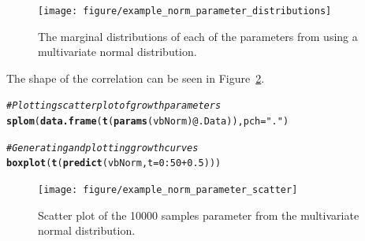 \documentclass[a4paper,english,10pt]{article}\usepackage[]{graphicx}\usepackage[]{color}
\makeatletter
\newcommand{\hlnum}[1]{\textcolor[rgb]{0.686,0.059,0.569}{#1}}%
\newcommand{\hlstr}[1]{\textcolor[rgb]{0.192,0.494,0.8}{#1}}%
\newcommand{\hlcom}[1]{\textcolor[rgb]{0.678,0.584,0.686}{\textit{#1}}}%
\newcommand{\hlopt}[1]{\textcolor[rgb]{0,0,0}{#1}}%
\newcommand{\hlstd}[1]{\textcolor[rgb]{0.345,0.345,0.345}{#1}}%
\newcommand{\hlkwc}[1]{\textcolor[rgb]{0.333,0.667,0.333}{#1}}%
\newcommand{\hlkwd}[1]{\textcolor[rgb]{0.737,0.353,0.396}{\textbf{#1}}}%
\newenvironment{kframe}{%
 \def\at@end@of@kframe{}%
 \ifinner\ifhmode%
  \def\at@end@of@kframe{\end{minipage}}%
  \begin{minipage}{\columnwidth}%
 \fi\fi%
 \def\FrameCommand##1{\hskip\@totalleftmargin \hskip-\fboxsep
 \colorbox{shadecolor}{##1}\hskip-\fboxsep
     \hskip-\linewidth \hskip-\@totalleftmargin \hskip\columnwidth}%
 \MakeFramed {\advance\hsize-\width
   \@totalleftmargin\z@ \linewidth\hsize
   \@setminipage}}%
 {\par\unskip\endMakeFramed%
 \at@end@of@kframe}
\newenvironment{knitrout}{}{} %
\makeatother
\begin{document}
\begin{figure}[h]
\begin{knitrout}
\color{fgcolor}

{\centering \texttt{[image: figure/example\_norm\_parameter\_distributions]} 

}



\end{knitrout}

\caption{The marginal distributions of each of the parameters from using a multivariate normal distribution.}
\label{fig:plot_norm_params}
\end{figure}

The shape of the correlation can be seen in Figure~\ref{fig:plot_norm_scatter}.
\begin{knitrout}
\color{fgcolor}\begin{kframe}
\begin{alltt}
\hlcom{# Plotting scatter plot of growth parameters}
\hlkwd{splom}\hlstd{(}\hlkwd{data.frame}\hlstd{(}\hlkwd{t}\hlstd{(}\hlkwd{params}\hlstd{(vbNorm)}\hlopt{@}\hlkwc{.Data}\hlstd{)),} \hlkwc{pch} \hlstd{=} \hlstr{"."}\hlstd{)}
\end{alltt}
\end{kframe}
\end{knitrout}


\begin{knitrout}
\color{fgcolor}\begin{kframe}
\begin{alltt}
\hlcom{# Generating and plotting growth curves}
\hlkwd{boxplot}\hlstd{(}\hlkwd{t}\hlstd{(}\hlkwd{predict}\hlstd{(vbNorm,} \hlkwc{t} \hlstd{=} \hlnum{0}\hlopt{:}\hlnum{50} \hlopt{+} \hlnum{0.5}\hlstd{)))}
\end{alltt}
\end{kframe}
\end{knitrout}


\begin{figure}[h]
\begin{knitrout}
\color{fgcolor}

{\centering \texttt{[image: figure/example\_norm\_parameter\_scatter]} 

}



\end{knitrout}

\caption{Scatter plot of the 10000 samples parameter from the multivariate normal distribution.}
\label{fig:plot_norm_scatter}
\end{figure}
\end{document}

